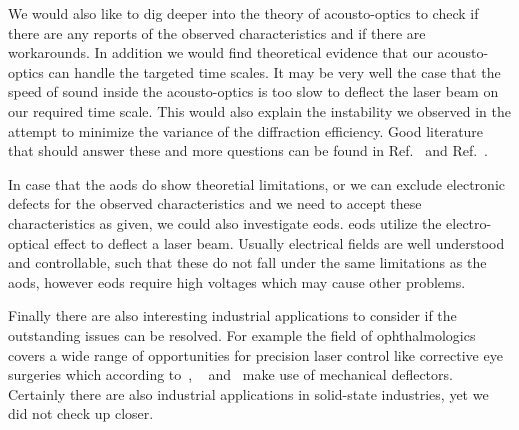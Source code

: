 We would also like to dig deeper into the theory of acousto-optics to check
if there are any reports of the observed characteristics and if there are
workarounds. In addition we would find theoretical evidence that our
acousto-optics can handle the targeted time scales. It may be very well the
case that the speed of sound inside the acousto-optics is too slow to deflect
the laser beam on our required time scale. This would also explain the
instability we observed in the attempt to minimize the variance of the
diffraction efficiency. Good literature that should answer these and more
questions can be found in Ref.~\cite{Goutzoulis1994} and Ref.~\cite{Royer1999}.

In case that the \gls{aod}s do show theoretial limitations, or we can exclude
electronic defects for the observed characteristics and we need to accept
these characteristics as given, we could also investigate \gls{eod}s.
\gls{eod}s utilize the electro-optical effect to deflect a laser beam. Usually
electrical fields are well understood and controllable, such that these do not
fall under the same limitations as the \gls{aod}s, however \gls{eod}s require
high voltages which may cause other problems.

Finally there are also interesting industrial applications to consider if the
outstanding issues can be resolved. For example the field of ophthalmologics
covers a wide range of opportunities for precision laser control like
corrective eye surgeries which according to~\cite{US20180110655},
~\cite{US20180064579} and~\cite{US7131968} make use of mechanical deflectors.
Certainly there are also industrial applications in solid-state industries,
yet we did not check up closer.

